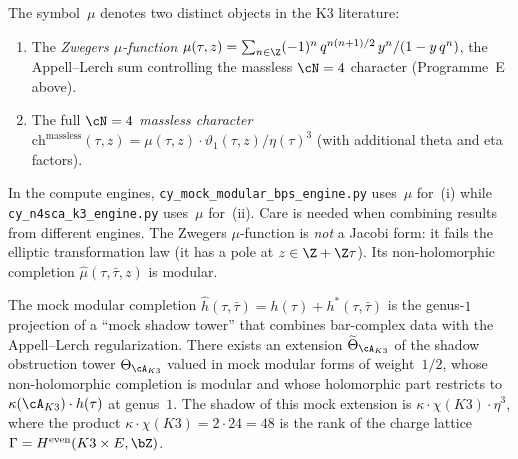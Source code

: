 \begin{warning}
\label{warn:mu-overloaded}
The symbol~$\mu$ denotes two distinct objects in the K3 literature:
\begin{enumerate}[label=\textup{(\roman*)}]
\item The \emph{Zwegers $\mu$-function}
 $\mu(\tau, z) = \sum_{n \in \Z}
 (-1)^n\,q^{n(n+1)/2}\,y^n/(1 - y\,q^n)$, the Appell--Lerch sum
 controlling the massless $\cN = 4$ character
 (Programme~E above).
\item The full \emph{$\cN = 4$ massless character}
 $\mathrm{ch}^{\mathrm{massless}}(\tau, z)
 = \mu(\tau, z) \cdot \vartheta_1(\tau, z)/\eta(\tau)^3$
 (with additional theta and eta factors).
\end{enumerate}
In the compute engines,
\texttt{cy\_mock\_modular\_bps\_engine.py} uses~$\mu$ for~(i)
while \texttt{cy\_n4sca\_k3\_engine.py} uses~$\mu$ for~(ii).
Care is needed when combining results from different engines.
The Zwegers $\mu$-function is \emph{not} a Jacobi form: it fails
the elliptic transformation law (it has a pole at
$z \in \Z + \Z\tau$). Its non-holomorphic completion
$\hat{\mu}(\tau, \bar\tau, z)$ is modular.
\end{warning}

\begin{conjecture}
\label{conj:mock-shadow-tower}
\ClaimStatusConjectured\quad
The mock modular completion
$\hat{h}(\tau,\bar\tau) = h(\tau) + h^*(\tau,\bar\tau)$
is the genus-$1$ projection of a ``mock shadow tower''
that combines bar-complex data with the Appell--Lerch
regularization. There exists an extension
$\widetilde{\Theta}_{\cA_{K3}}$ of the shadow
obstruction tower $\Theta_{\cA_{K3}}$ valued in mock
modular forms of weight~$1/2$, whose non-holomorphic
completion is modular and whose holomorphic part restricts
to $\kappa(\cA_{K3}) \cdot h(\tau)$ at genus~$1$.
The shadow of this mock extension is
$\kappa \cdot \chi(K3) \cdot \eta^3$,
where the product $\kappa \cdot \chi(K3) = 2 \cdot 24 = 48$
is the rank of the charge lattice
$\Gamma = H^{\mathrm{even}}(K3 \times E, \bZ)$.
\end{conjecture}



